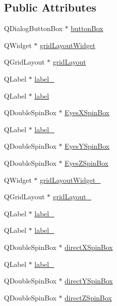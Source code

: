 \subsection*{Public Attributes}
\begin{DoxyCompactItemize}
\item 
Q\+Dialog\+Button\+Box $\ast$ \hyperlink{class_ui___dialog__view_a21a8c87fb64b14eee9315ef19a3a3bb3}{button\+Box}
\item 
Q\+Widget $\ast$ \hyperlink{class_ui___dialog__view_a0e98ef3e72073f15b6280ca2537d81ab}{grid\+Layout\+Widget}
\item 
Q\+Grid\+Layout $\ast$ \hyperlink{class_ui___dialog__view_a77d16d3ffbeacd2ea7f8ffef5bd4efc3}{grid\+Layout}
\item 
Q\+Label $\ast$ \hyperlink{class_ui___dialog__view_a504f628127fabf2128d41b30b41fb6b8}{label\+\_}
\item 
Q\+Label $\ast$ \hyperlink{class_ui___dialog__view_a7707206ee512ad1f786ed09affc4eb4d}{label}
\item 
Q\+Double\+Spin\+Box $\ast$ \hyperlink{class_ui___dialog__view_ae5840f6fd0b53493f85a37dcef58c403}{Eyes\+X\+Spin\+Box}
\item 
Q\+Label $\ast$ \hyperlink{class_ui___dialog__view_af3b0c37547a69ec18c44042dd3375891}{label\+\_}
\item 
Q\+Double\+Spin\+Box $\ast$ \hyperlink{class_ui___dialog__view_ab168044e11d249b7a1691544cb0a9a78}{Eyes\+Y\+Spin\+Box}
\item 
Q\+Double\+Spin\+Box $\ast$ \hyperlink{class_ui___dialog__view_ab57dcc3630e280bf882e0d2112536570}{Eyes\+Z\+Spin\+Box}
\item 
Q\+Widget $\ast$ \hyperlink{class_ui___dialog__view_aa6d06ff1a4eae6c50829603637aa6ca8}{grid\+Layout\+Widget\+\_}
\item 
Q\+Grid\+Layout $\ast$ \hyperlink{class_ui___dialog__view_afca9ea5a2e97534872dbe646959e84fd}{grid\+Layout\+\_}
\item 
Q\+Label $\ast$ \hyperlink{class_ui___dialog__view_adaacfa86807c44a8d109094dc59cf9ee}{label\+\_}
\item 
Q\+Label $\ast$ \hyperlink{class_ui___dialog__view_abf2ec29f6da83bbac98d9fca33ab3826}{label\+\_}
\item 
Q\+Double\+Spin\+Box $\ast$ \hyperlink{class_ui___dialog__view_a24813e55f1437289dd4cdd90780dded6}{direct\+X\+Spin\+Box}
\item 
Q\+Label $\ast$ \hyperlink{class_ui___dialog__view_ae3bba8bcf5013ea73da92adc6cd9384f}{label\+\_}
\item 
Q\+Double\+Spin\+Box $\ast$ \hyperlink{class_ui___dialog__view_a96ef0cc5874bf7279969cc8a42ab4638}{direct\+Y\+Spin\+Box}
\item 
Q\+Double\+Spin\+Box $\ast$ \hyperlink{class_ui___dialog__view_aec4dbf7f3b1f9d0491fcd20d31767881}{direct\+Z\+Spin\+Box}
\end{DoxyCompactItemize}


